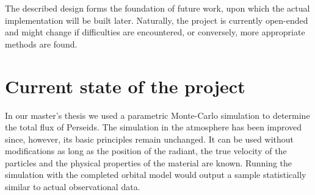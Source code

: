 
The described design forms the foundation of future work, upon which the actual implementation will be built later.
Naturally, the project is currently open-ended and might change if difficulties are encountered,
or conversely, more appropriate methods are found.

%
%

\section{Current state of the project} \label{pc}
    In our master's thesis \citep{balaz-thesis} we used a parametric Monte-Carlo simulation
    to determine the total flux of Perseids.
    The simulation in the atmosphere has been improved since, however, its basic principles
    remain unchanged. It can be used without modifications as long as the position of the radiant,
    the true velocity of the particles and the physical properties of the material are known.
    Running the simulation with the completed orbital model would output a sample statistically
    similar to actual observational data.

